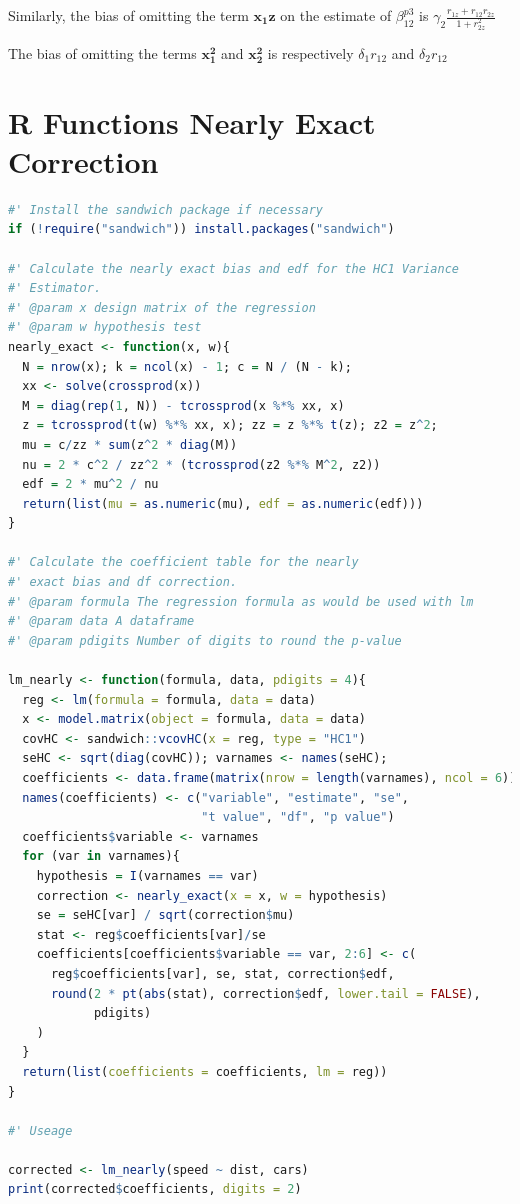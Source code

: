 \documentclass[12pt]{article}
\begin{document}
Similarly, the bias of omitting the term $\mathbf{x_1 z}$ on the estimate of $\beta^{p3}_{12}$ is  $\gamma_2 \frac{r_{1z} + r_{12} r_{2z}}{1 + r_{2z}^2}$

The bias of omitting the terms $\mathbf{x_1^2}$ and $\mathbf{x_2^2}$ is respectively $\delta_1 r_{12}$ and $\delta_2 r_{12}$

\section{R Functions Nearly Exact Correction} \label{appendix-R}
\begin{lstlisting}[language=R]
#' Install the sandwich package if necessary
if (!require("sandwich")) install.packages("sandwich")

#' Calculate the nearly exact bias and edf for the HC1 Variance
#' Estimator.
#' @param x design matrix of the regression
#' @param w hypothesis test
nearly_exact <- function(x, w){
  N = nrow(x); k = ncol(x) - 1; c = N / (N - k);
  xx <- solve(crossprod(x))
  M = diag(rep(1, N)) - tcrossprod(x %*% xx, x)
  z = tcrossprod(t(w) %*% xx, x); zz = z %*% t(z); z2 = z^2;
  mu = c/zz * sum(z^2 * diag(M))
  nu = 2 * c^2 / zz^2 * (tcrossprod(z2 %*% M^2, z2))
  edf = 2 * mu^2 / nu
  return(list(mu = as.numeric(mu), edf = as.numeric(edf)))
}

#' Calculate the coefficient table for the nearly
#' exact bias and df correction.
#' @param formula The regression formula as would be used with lm
#' @param data A dataframe
#' @param pdigits Number of digits to round the p-value

lm_nearly <- function(formula, data, pdigits = 4){
  reg <- lm(formula = formula, data = data)
  x <- model.matrix(object = formula, data = data)
  covHC <- sandwich::vcovHC(x = reg, type = "HC1")
  seHC <- sqrt(diag(covHC)); varnames <- names(seHC); 
  coefficients <- data.frame(matrix(nrow = length(varnames), ncol = 6))
  names(coefficients) <- c("variable", "estimate", "se",
                           "t value", "df", "p value")
  coefficients$variable <- varnames
  for (var in varnames){
    hypothesis = I(varnames == var)
    correction <- nearly_exact(x = x, w = hypothesis)
    se = seHC[var] / sqrt(correction$mu)
    stat <- reg$coefficients[var]/se
    coefficients[coefficients$variable == var, 2:6] <- c(
      reg$coefficients[var], se, stat, correction$edf, 
      round(2 * pt(abs(stat), correction$edf, lower.tail = FALSE),
            pdigits)
    )
  }
  return(list(coefficients = coefficients, lm = reg))
}

#' Useage

corrected <- lm_nearly(speed ~ dist, cars)
print(corrected$coefficients, digits = 2)
\end{lstlisting}
\end{document}
